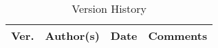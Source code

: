 \documentclass[12pt,a4paper,onecolumn]{article}
\author{MMRFIC Technology Pvt. Ltd., Bangalore}
\title{}
\begin{document}
\maketitle
\vfill

\begin{table}[h]
\begin{center}
\begin{tabular}{llll}
\hline
Ver. & Author(s) & Date & Comments \\
\hline \hline
\hline
\end{tabular}
\caption{Version History}
\end{center}
\end{table}
\newpage
\tableofcontents
\newpage
\end{document}
